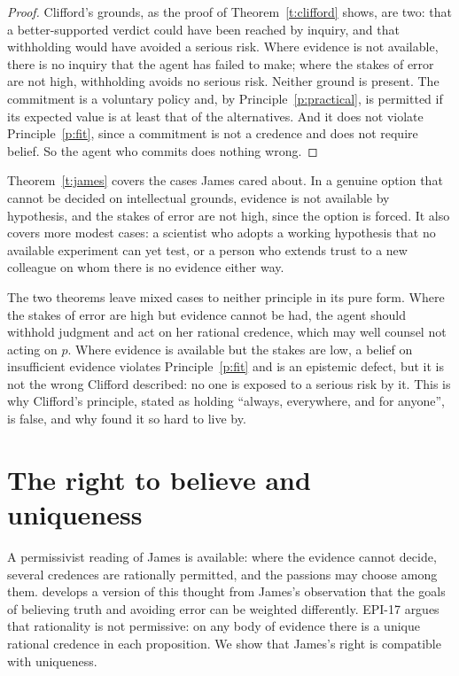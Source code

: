 \documentclass{situationist-preprint}
\begin{document}
\begin{proof}
Clifford's grounds, as the proof of Theorem~\ref{t:clifford} shows, are two: that a better-supported verdict could have been reached by inquiry, and that withholding would have avoided a serious risk. Where evidence is not available, there is no inquiry that the agent has failed to make; where the stakes of error are not high, withholding avoids no serious risk. Neither ground is present. The commitment is a voluntary policy and, by Principle~\ref{p:practical}, is permitted if its expected value is at least that of the alternatives. And it does not violate Principle~\ref{p:fit}, since a commitment is not a credence and does not require belief. So the agent who commits does nothing wrong.
\end{proof}

Theorem~\ref{t:james} covers the cases James cared about. In a genuine option that cannot be decided on intellectual grounds, evidence is not available by hypothesis, and the stakes of error are not high, since the option is forced. It also covers more modest cases: a scientist who adopts a working hypothesis that no available experiment can yet test, or a person who extends trust to a new colleague on whom there is no evidence either way.

The two theorems leave mixed cases to neither principle in its pure form. Where the stakes of error are high but evidence cannot be had, the agent should withhold judgment and act on her rational credence, which may well counsel not acting on $p$. Where evidence is available but the stakes are low, a belief on insufficient evidence violates Principle~\ref{p:fit} and is an epistemic defect, but it is not the wrong Clifford described: no one is exposed to a serious risk by it. This is why Clifford's principle, stated as holding \enquote{always, everywhere, and for anyone}, is false, and why \citet{vanInwagen1996} found it so hard to live by.

\section{The right to believe and uniqueness}\label{s:unique}

A permissivist reading of James is available: where the evidence cannot decide, several credences are rationally permitted, and the passions may choose among them. \citet{Kelly2014} develops a version of this thought from James's observation that the goals of believing truth and avoiding error can be weighted differently. EPI-17 argues that rationality is not permissive: on any body of evidence there is a unique rational credence in each proposition. We show that James's right is compatible with uniqueness.
\end{document}
